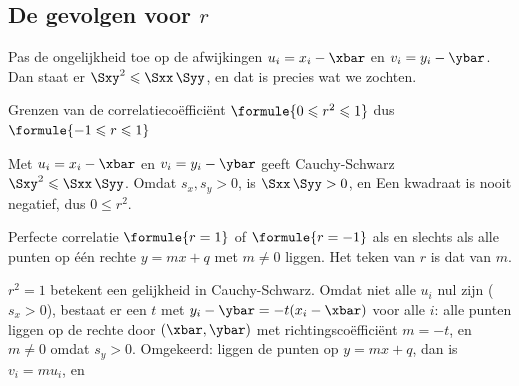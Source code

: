 
\begin{oefeningen}
\end{oefeningen}

\subsection{De gevolgen voor $r$}

Pas de ongelijkheid toe op de afwijkingen $u_i = x_i - \xbar$ en $v_i = y_i - \ybar$. Dan staat er $\Sxy^2 \leqslant \Sxx\,\Syy$, en dat is precies wat we zochten.

\begin{theorie}
\begin{stelling}{Grenzen van de correlatiecoëfficiënt}
\qquad $\formule{0 \leqslant r^2 \leqslant 1}$ \qquad dus \qquad $\formule{-1 \leqslant r \leqslant 1}$
\end{stelling}

\begin{bewijs}
Met $u_i = x_i - \xbar$ en $v_i = y_i - \ybar$ geeft Cauchy-Schwarz $\Sxy^2 \leqslant \Sxx\,\Syy$. Omdat $s_x, s_y > 0$, is $\Sxx\,\Syy > 0$, en
Een kwadraat is nooit negatief, dus $0 \leqslant r^2$.
\end{bewijs}

\begin{stelling}{Perfecte correlatie}
$\formule{r = 1}$ of $\formule{r = -1}$ als en slechts als alle punten op één rechte $y = mx + q$ met $m \neq 0$ liggen. Het teken van $r$ is dat van $m$.
\end{stelling}

\begin{bewijs}
$r^2 = 1$ betekent een gelijkheid in Cauchy-Schwarz. Omdat niet alle $u_i$ nul zijn ($s_x > 0$), bestaat er een $t$ met $y_i - \ybar = -t(x_i - \xbar)$ voor alle $i$: alle punten liggen op de rechte door $(\xbar, \ybar)$ met richtingscoëfficiënt $m = -t$, en $m \neq 0$ omdat $s_y > 0$. Omgekeerd: liggen de punten op $y = mx + q$, dan is $v_i = m u_i$, en
\end{bewijs}
\end{theorie}

